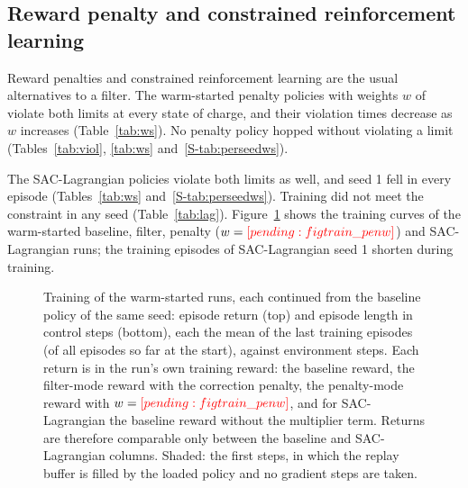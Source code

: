 \subsection{Reward penalty and constrained reinforcement learning}\label{sec:penlag}
Reward penalties and constrained reinforcement learning are the usual alternatives to a filter. The warm-started penalty policies with weights $w$ of  violate both limits at every state of charge, and their violation times decrease as $w$ increases (Table~\ref{tab:ws}). No penalty policy hopped without violating a limit (Tables~\ref{tab:viol}, \ref{tab:ws} and~\ref{S-tab:perseedws}).

The SAC-Lagrangian policies violate both limits as well, and seed 1 fell in every episode (Tables~\ref{tab:ws} and~\ref{S-tab:perseedws}). Training did not meet the constraint in any seed (Table~\ref{tab:lag}). Figure~\ref{fig:training} shows the training curves of the warm-started baseline, filter, penalty ($w=\res{figtrain_penw}$) and SAC-Lagrangian runs; the training episodes of SAC-Lagrangian seed 1 shorten during training.\begin{figure}[tbp]\centering{}\caption{Training of the warm-started runs, each continued from the baseline policy of the same seed: episode return (top) and episode length in control steps (bottom), each the mean of the last  training episodes (of all episodes so far at the start), against environment steps. Each return is in the run's own training reward: the baseline reward, the filter-mode reward with the correction penalty, the penalty-mode reward with $w=\res{figtrain_penw}$, and for SAC-Lagrangian the baseline reward without the multiplier term. Returns are therefore comparable only between the baseline and SAC-Lagrangian columns. Shaded: the first  steps, in which the replay buffer is filled by the loaded policy and no gradient steps are taken.}\label{fig:training}\end{figure}
\begin{table}[tbp]\centering\caption{SAC-Lagrangian training, per seed: number of training episodes, multiplier $\mu$ at the end of training and the largest value it reached, and the mean episode cost $\bar\ell$ and episode length (Length) over the last  training episodes. Cost limit $d=\res{lag_d}$; an episode has at most  control steps.}\label{tab:lag}
\end{table}


